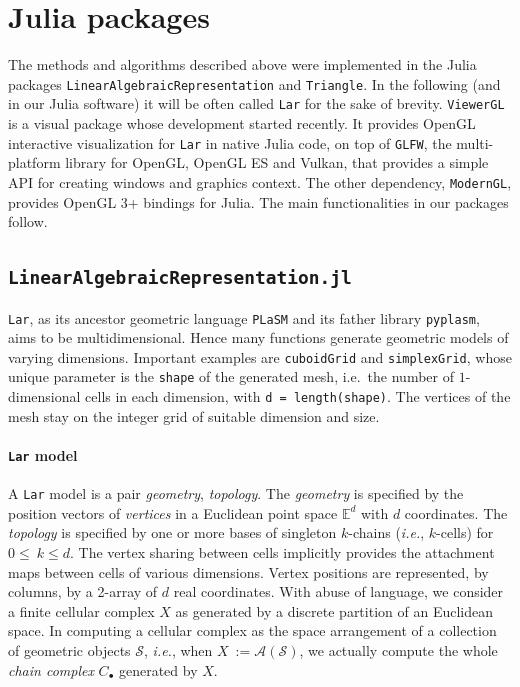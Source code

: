 \documentclass{juliacon}
\def\E{\mathbb{E}}
\begin{document}
\section{Julia packages}

The methods and algorithms described above were implemented in the Julia packages \texttt{LinearAlgebraicRepresentation} and \texttt{Triangle}. In the following (and in our Julia software) it will be often called \texttt{\texttt{Lar}} for the sake of brevity. \texttt{ViewerGL} is a visual package whose development started recently.  It provides OpenGL interactive visualization for \texttt{\texttt{Lar}} in native Julia code, on top of \texttt{GLFW}, 
the multi-platform library for OpenGL, OpenGL ES and Vulkan, that  provides a simple API for creating windows and graphics context. The other dependency, \texttt{ModernGL}, provides OpenGL 3+ bindings for Julia. The main functionalities in our packages follow.


\subsection{\texttt{LinearAlgebraicRepresentation.jl}}
\texttt{\texttt{Lar}}, as its ancestor geometric
language \texttt{PLaSM} and its father library \texttt{pyplasm}, aims to
be multidimensional. Hence many functions generate geometric models of
varying dimensions. Important examples are \texttt{cuboidGrid} and
\texttt{simplexGrid}, whose unique parameter is the \texttt{shape} of the
generated mesh, i.e.~the number of \(1\)-dimensional cells in each
dimension, with \texttt{d = length(shape)}. The vertices of the mesh
stay on the integer grid of suitable dimension and size.

\paragraph*{\texttt{Lar} model}
A \texttt{Lar} model is a pair \emph{geometry}, \emph{topology}. The
\emph{geometry} is specified by the position vectors of \emph{vertices}
in a Euclidean point space $\E^d$
with $d$ coordinates. The \emph{topology} is specified by one or
more bases of singleton $k$-chains
(\emph{i.e.}, $k$-cells) for
$0 \leq\ k\leq d$. The vertex
sharing between cells implicitly provides the attachment maps between
cells of various dimensions. Vertex positions are represented, by
columns, by a 2-array of $d$ real coordinates. 
With abuse of language, we consider a finite cellular complex $X$
as generated by a discrete partition of an Euclidean space. In computing
a cellular complex as the space arrangement of a collection of geometric
objects $\mathcal{S}$, \emph{i.e.}, when
$X\ := \mathcal{A}(\mathcal{S})$,
we actually compute the whole \emph{chain complex}
$C_\bullet$ generated by $X$.
\end{document}
